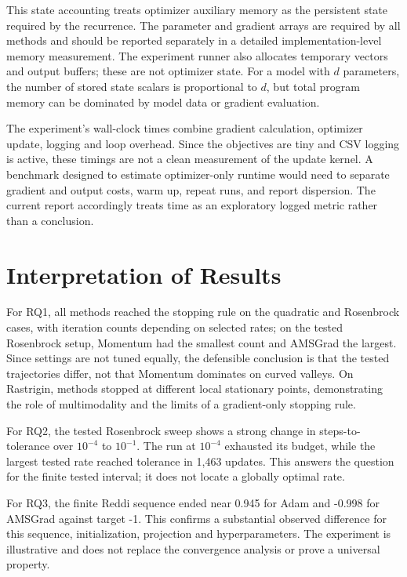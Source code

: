 ﻿\documentclass[conference]{IEEEtran}
\begin{document}
This state accounting treats optimizer auxiliary memory as the persistent state required by the recurrence. The parameter and gradient arrays are required by all methods and should be reported separately in a detailed implementation-level memory measurement. The experiment runner also allocates temporary vectors and output buffers; these are not optimizer state. For a model with $d$ parameters, the number of stored state scalars is proportional to $d$, but total program memory can be dominated by model data or gradient evaluation.

The experiment's wall-clock times combine gradient calculation, optimizer update, logging and loop overhead. Since the objectives are tiny and CSV logging is active, these timings are not a clean measurement of the update kernel. A benchmark designed to estimate optimizer-only runtime would need to separate gradient and output costs, warm up, repeat runs, and report dispersion. The current report accordingly treats time as an exploratory logged metric rather than a conclusion.
\section{Interpretation of Results}
For RQ1, all methods reached the stopping rule on the quadratic and Rosenbrock cases, with iteration counts depending on selected rates; on the tested Rosenbrock setup, Momentum had the smallest count and AMSGrad the largest. Since settings are not tuned equally, the defensible conclusion is that the tested trajectories differ, not that Momentum dominates on curved valleys. On Rastrigin, methods stopped at different local stationary points, demonstrating the role of multimodality and the limits of a gradient-only stopping rule.

For RQ2, the tested Rosenbrock sweep shows a strong change in steps-to-tolerance over $10^{-4}$ to $10^{-1}$. The run at $10^{-4}$ exhausted its budget, while the largest tested rate reached tolerance in 1,463 updates. This answers the question for the finite tested interval; it does not locate a globally optimal rate.

For RQ3, the finite Reddi sequence ended near 0.945 for Adam and -0.998 for AMSGrad against target -1. This confirms a substantial observed difference for this sequence, initialization, projection and hyperparameters. The experiment is illustrative and does not replace the convergence analysis or prove a universal property.
\end{document}
